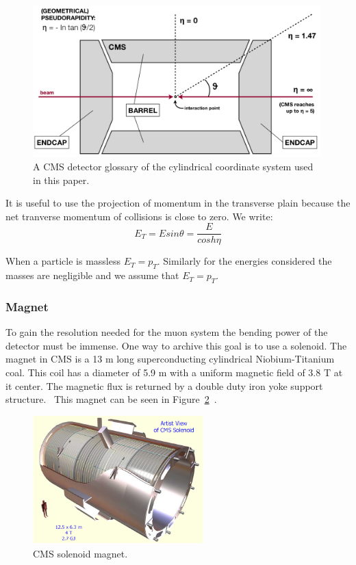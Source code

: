 \begin{figure}[htb]
\centering
\includegraphics[width=0.99\textwidth]{Experiment/DetectorGlossary.png}
\caption{A CMS detector glossary of the cylindrical coordinate system used in this paper. ~\cite{Pandolfi_talk}}
\label{fig:CMS_detector_glossary}
\end{figure}

It is useful to use the projection of momentum in the transverse plain because the net tranverse momentum of collisions is close to zero.  We write:
\begin{equation} E_T = E sin \theta = \dfrac{E}{cosh\eta} \label{eq:transverse_energy}\end{equation}

When a particle is massless $E_T=p_T$.  Similarly for the energies considered the masses are negligible and we assume that $E_T=p_T$.

\subsubsection{Magnet}

To gain the resolution needed for the muon system the bending power of the detector must be immense.  One way to archive this goal is to use a solenoid.  The magnet in CMS is a 13 m long superconducting cylindrical Niobium-Titanium coal.  This coil has a diameter of 5.9 m with a uniform magnetic field of 3.8 T at it center.  The magnetic flux is returned by a double duty iron yoke support structure.~\cite{Magnet_CMS} This magnet can be seen in Figure~\ref{fig:CMS_solenoid_magnet}~\cite{cms_solenoid_magnet}.

\begin{figure}[htb]
\centering
\includegraphics[width=0.59\textwidth]{Experiment/CMS-solenoid-magnet.jpg}
\caption{CMS solenoid magnet.~\cite{cms_solenoid_magnet}}
\label{fig:CMS_solenoid_magnet}
\end{figure}


